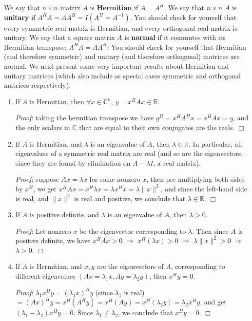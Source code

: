 \documentclass[12pt,oneside]{article}
\begin{document}
We say that $n \times n$ matrix $A$ is \textbf{Hermitian} if $A =
A^H$. We say that $n \times n$ $A$ is \textbf{unitary} if $A^H A = A
A^H = I (A^H = A^{-1})$. You should check for yourself that every
symmetric real matrix is  Hermitian, and every orthogonal real matrix
is unitary. We say that a square matrix $A$ is \textbf{normal} if it
commutes with its Hermitian transpose: $A^H A = A A^H$. You should
check for yourself that Hermitian (and therefore symmetric) and
unitary (and therefore orthogonal) matrices are normal.  We next
present some very important results about Hermitian and unitary
matrices (which also include as special cases symmetric and orthogonal
matrices respectively):
\begin{enumerate}
\item If $A$ is Hermitian, then $\forall x \in \mathbb{C}^n$, $y = x^H A x
  \in \mathbb{R}$.

\emph{Proof}: taking the hermitian transpose we have $y^H
  = x^H A^H x = x^H A x = y$, and the only scalars in $\mathbb{C}$
  that are equal to their own conjugates are the reals. $\Box$

\item If $A$ is Hermitian, and $\lambda$ is an eigenvalue of $A$, then
  $\lambda \in \mathbb{R}$. In particular, all eigenvalues of a
  symmetric real matrix are real (and so are the eigenvectors, since
  they are found by elimination on $A - \lambda I$, a real
  matrix).

\emph{Proof}: suppose $A x = \lambda x$ for some nonzero $x$, then
  pre-multiplying both sides by $x^H$, we get $x^H A x = x^H \lambda x
  = \lambda x^H x = \lambda \|x\|^2$, and since the left-hand side is
  real, and $\|x\|^2$ is real and positive, we conclude that $\lambda
  \in \mathbb{R}$. $\Box$

\item If $A$ is positive definite, and $\lambda$ is an eigenvalue of
  $A$, then $\lambda > 0$.

\emph{Proof}: Let nonzero $x$ be the
  eigenvector corresponding to $\lambda$. Then since $A$ is positive
  definite, we have $x^HAx > 0$ $\Longrightarrow$ $x^H (\lambda x) > 0$
  $\Longrightarrow$ $\lambda \|x\|^2 > 0$ $\Longrightarrow$ $\lambda >
  0$. $\Box$

\item If $A$ is Hermitian, and $x, y$ are the eigenvectors of $A$,
  corresponding to different eigenvalues $(Ax = \lambda_1 x, Ay =
  \lambda_2 y)$, then $x^H y = 0$.

\emph{Proof}: $\lambda_1 x^H y =
  (\lambda_1 x)^H y$ (since $\lambda_1$ is real) $= (Ax)^H y = x^H
  (A^H y) = x^H (A y) = x^H (\lambda_2 y) = \lambda_2 x^H y$, and get
  $(\lambda_1 - \lambda_2) x^H y = 0$. Since $\lambda_1 \neq
  \lambda_2$, we conclude that $x^H y = 0$. $\Box$



\end{enumerate}
\end{document}
